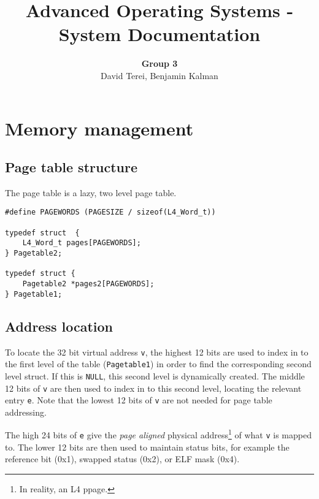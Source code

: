 \documentclass[12pt,english]{article}
\begin{document}

\title{Advanced Operating Systems - System Documentation}
\author{\textbf{Group 3} \\ David Terei, Benjamin Kalman}
\maketitle

\tableofcontents{}


\section{Memory management}

\subsection{Page table structure}

The page table is a lazy, two level page table.  

\begin{verbatim}
#define PAGEWORDS (PAGESIZE / sizeof(L4_Word_t))

typedef struct  {
    L4_Word_t pages[PAGEWORDS];
} Pagetable2;

typedef struct {
    Pagetable2 *pages2[PAGEWORDS];
} Pagetable1;
\end{verbatim}

\subsection{Address location}

To locate the 32 bit virtual address \texttt{v}, the highest 12 bits are used to index in to the first level of the table (\texttt{Pagetable1}) in order to find the corresponding second level struct.  If this is \texttt{NULL}, this second level is dynamically created.  The middle 12 bits of \texttt{v} are then used to index in to this second level, locating the relevant entry \texttt{e}.  Note that the lowest 12 bits of \texttt{v} are not needed for page table addressing.

The high 24 bits of \texttt{e} give the \emph{page aligned} physical address\footnote{In reality, an L4 ppage.} of what \texttt{v} is mapped to.  The lower 12 bits are then used to maintain status bits, for example the reference bit (0x1), swapped status (0x2), or ELF mask (0x4).
\end{document}
